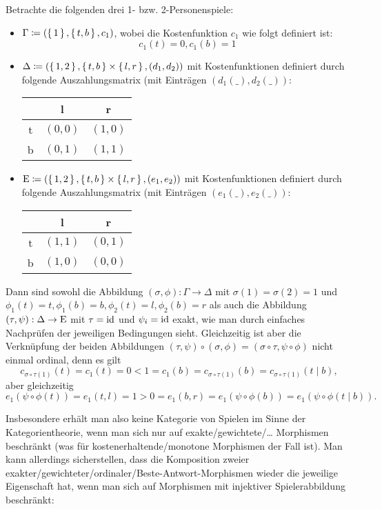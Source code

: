 \begin{bsp}\label{bsp:GegenbspKompositionVMorphismen}
	Betrachte die folgenden drei 1- bzw. 2-Personenspiele:
	\begin{itemize}
		\item $\Gamma \coloneqq (\set{1}, \set{t, b}, c_1)$, wobei die Kostenfunktion $c_1$ wie folgt definiert ist: 
			\[c_1(t) = 0, c_1(b) = 1\]
		\item $\Delta \coloneqq (\set{1, 2}, \set{t, b} \times \set{l, r}, (d_1, d_2))$ mit Kostenfunktionen definiert durch folgende Auszahlungsmatrix (mit Einträgen $(d_1(\_), d_2(\_))$:
		\begin{center}
				\begin{tabular}{c||c|c}
					& l 		& r 		\\\hline\hline
				t	& $(0,0)$	& $(1,0)$	\\\hline
				b	& $(0,1)$	& $(1,1)$ 
			\end{tabular}
		\end{center}
		\item $\mathrm{E} \coloneqq (\set{1, 2}, \set{t, b} \times \set{l, r}, (e_1, e_2))$ mit Kostenfunktionen definiert durch folgende Auszahlungsmatrix (mit Einträgen $(e_1(\_), e_2(\_))$:
		\begin{center}
			\begin{tabular}{c||c|c}
				& l 		& r 		\\\hline\hline
			t	& $(1,1)$	& $(0,1)$	\\\hline
			b	& $(1,0)$	& $(0,0)$ 
			\end{tabular}
		\end{center}
	\end{itemize}
	Dann sind sowohl die Abbildung $(\sigma, \phi): \Gamma \to \Delta$ mit $\sigma(1) = \sigma(2) = 1$ und $\phi_1(t) = t, \phi_1(b) = b, \phi_2(t) = l, \phi_2(b) = r$ als auch die Abbildung $(\tau, \psi): \Delta \to \mathrm{E}$ mit $\tau = \mathrm{id}$ und $\psi_i = \mathrm{id}$ exakt, wie man durch einfaches Nachprüfen der jeweiligen Bedingungen sieht. Gleichzeitig ist aber die Verknüpfung der beiden Abbildungen $(\tau, \psi)\circ(\sigma, \phi) = (\sigma\circ\tau, \psi\circ\phi)$ nicht einmal ordinal, denn es gilt
		\[c_{\sigma\circ\tau(1)}(t) = c_1(t) = 0 < 1 = c_1(b) = c_{\sigma\circ\tau(1)}(b) = c_{\sigma\circ\tau(1)}(t \mid b),\]
	aber gleichzeitig
		\[e_1(\psi\circ\phi(t)) = e_1(t,l) = 1 > 0 = e_1(b,r) = e_1(\psi\circ\phi(b)) = e_1(\psi\circ\phi(t \mid b)).\]
\end{bsp}

Insbesondere erhält man also keine Kategorie von Spielen im Sinne der Kategorientheorie, wenn man sich nur auf exakte/gewichtete/\dots{} Morphismen beschränkt (was für kostenerhaltende/monotone Morphismen der Fall ist). Man kann allerdings sicherstellen, dass die Komposition zweier exakter/gewichteter/ordinaler/Beste-Antwort-Morphismen wieder die jeweilige Eigenschaft hat, wenn man sich auf Morphismen mit injektiver Spielerabbildung beschränkt:

